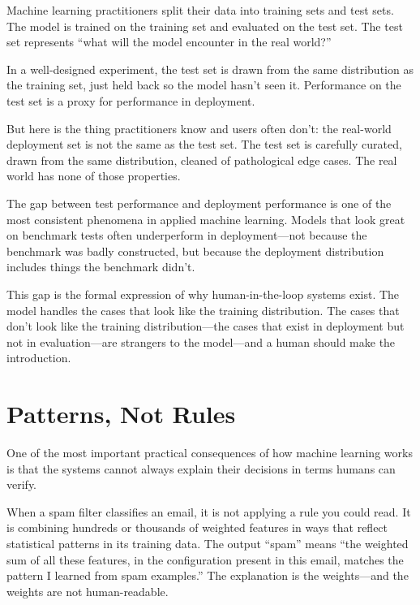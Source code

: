 Machine learning practitioners split their data into training sets and test sets. The model is trained on the training set and evaluated on the test set. The test set represents ``what will the model encounter in the real world?''

In a well-designed experiment, the test set is drawn from the same distribution as the training set, just held back so the model hasn't seen it. Performance on the test set is a proxy for performance in deployment.

But here is the thing practitioners know and users often don't: the real-world deployment set is not the same as the test set. The test set is carefully curated, drawn from the same distribution, cleaned of pathological edge cases. The real world has none of those properties.

The gap between test performance and deployment performance is one of the most consistent phenomena in applied machine learning. Models that look great on benchmark tests often underperform in deployment---not because the benchmark was badly constructed, but because the deployment distribution includes things the benchmark didn't.

\begin{keyconcept}
This gap is the formal expression of why human-in-the-loop systems exist. The model handles the cases that look like the training distribution. The cases that don't look like the training distribution---the cases that exist in deployment but not in evaluation---are strangers to the model---and a human should make the introduction.
\end{keyconcept}

\section{Patterns, Not Rules}

One of the most important practical consequences of how machine learning works is that the systems cannot always explain their decisions in terms humans can verify.

When a spam filter classifies an email, it is not applying a rule you could read. It is combining hundreds or thousands of weighted features in ways that reflect statistical patterns in its training data. The output ``spam'' means ``the weighted sum of all these features, in the configuration present in this email, matches the pattern I learned from spam examples.'' The explanation is the weights---and the weights are not human-readable.

